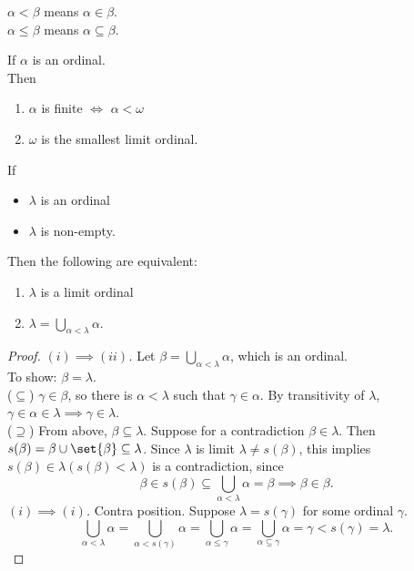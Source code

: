 \begin{notation}
    $\alpha < \beta$ means $\alpha \in \beta$.\\
    $\alpha \leq \beta$ means $\alpha \subseteq \beta$.
\end{notation}

\begin{exercise}
    If $\alpha$ is an ordinal.\\
    Then 
    \begin{enumerate}[label=(\roman*)]
        \item $\alpha$ is finite $\iff$ $\alpha < \omega$
        \item $\omega$ is the smallest limit ordinal.
    \end{enumerate}
\end{exercise}

\begin{proposition}
    If 
    \begin{itemize}
        \item $\lambda$ is an ordinal
        \item $\lambda$ is non-empty.
    \end{itemize}
    Then the following are equivalent:
    \begin{enumerate}[label=(\roman*)]
        \item $\lambda$ is a limit ordinal
        \item $\lambda = \bigcup\limits_{\alpha < \lambda} \alpha$.
    \end{enumerate}
\end{proposition}
\begin{proof}
    \emph{$(i) \implies (ii)$.} Let $\beta = \bigcup\limits_{\alpha < \lambda} \alpha$, which is an ordinal.\\
    To show: $\beta = \lambda.$\\
    ($\subseteq$) $\gamma \in \beta$, so there is $\alpha < \lambda$ such that $\gamma \in \alpha$. 
    By transitivity of $\lambda$, $\gamma \in \alpha \in \lambda \implies \gamma \in \lambda$.\\
    ($\supseteq$) From above, $\beta \subseteq \lambda$. Suppose for a contradiction $\beta \in \lambda$.
    Then $s(\beta) = \beta \cup \set{\beta} \subseteq \lambda$. Since $\lambda$ is limit $\lambda \ne s(\beta)$, 
    this implies $s(\beta) \in \lambda (s(\beta) < \lambda)$ is a contradiction, since 
    $$ \beta \in s(\beta) \subseteq \bigcup_{\alpha < \lambda} \alpha = \beta \implies \beta \in \beta. $$
    \emph{$(i) \implies (i)$.} Contra position. Suppose $\lambda = s(\gamma)$ for some ordinal $\gamma$.
    $$ \bigcup_{\alpha < \lambda} \alpha = \bigcup_{\alpha < s(\gamma)} \alpha = \bigcup_{\alpha \leq \gamma} \alpha
        = \bigcup_{\alpha \subseteq \gamma} \alpha = \gamma < s(\gamma) = \lambda.$$
\end{proof}

